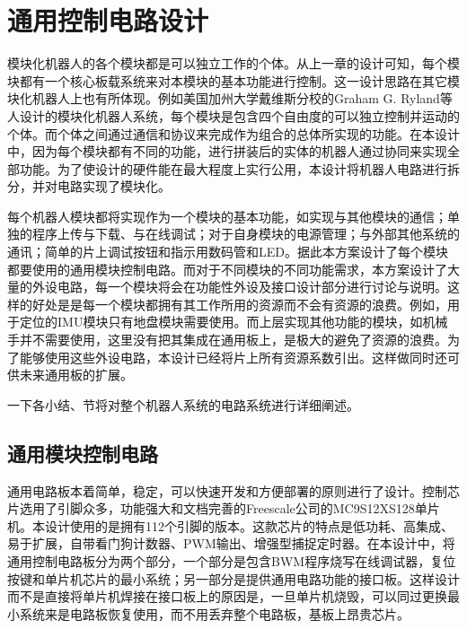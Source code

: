 

\chapter{通用控制电路设计}
\label{chap:electricalSystem}
模块化机器人的各个模块都是可以独立工作的个体。从上一章的设计可知，每个模块都有一个核心板载系统来对本模块的基本功能进行控制。这一设计思路在其它模块化机器人上也有所体现。例如美国加州大学戴维斯分校的Graham G. Ryland等人设计的模块化机器人系统，每个模块是包含四个自由度的可以独立控制并运动的个体。而个体之间通过通信和协议来完成作为组合的总体所实现的功能。在本设计中，因为每个模块都有不同的功能，进行拼装后的实体的机器人通过协同来实现全部功能。为了使设计的硬件能在最大程度上实行公用，本设计将机器人电路进行拆分，并对电路实现了模块化。

每个机器人模块都将实现作为一个模块的基本功能，如实现与其他模块的通信；单独的程序上传与下载、与在线调试；对于自身模块的电源管理；与外部其他系统的通讯；简单的片上调试按钮和指示用数码管和LED。据此本方案设计了每个模块都要使用的通用模块控制电路。而对于不同模块的不同功能需求，本方案设计了大量的外设电路，每一个模块将会在功能性外设及接口设计部分进行讨论与说明。这样的好处是是每一个模块都拥有其工作所用的资源而不会有资源的浪费。例如，用于定位的IMU模块只有地盘模块需要使用。而上层实现其他功能的模块，如机械手并不需要使用，这里没有把其集成在通用板上，是极大的避免了资源的浪费。为了能够使用这些外设电路，本设计已经将片上所有资源系数引出。这样做同时还可供未来通用板的扩展。

一下各小结、节将对整个机器人系统的电路系统进行详细阐述。

\section{通用模块控制电路}
通用电路板本着简单，稳定，可以快速开发和方便部署的原则进行了设计。控制芯片选用了引脚众多，功能强大和文档完善的Freescale公司的MC9S12XS128单片机。本设计使用的是拥有112个引脚的版本。这款芯片的特点是低功耗、高集成、易于扩展，自带看门狗计数器、PWM输出、增强型捕捉定时器。在本设计中，将通用控制电路板分为两个部分，一个部分是包含BWM程序烧写在线调试器，复位按键和单片机芯片的最小系统；另一部分是提供通用电路功能的接口板。这样设计而不是直接将单片机焊接在接口板上的原因是，一旦单片机烧毁，可以同过更换最小系统来是电路板恢复使用，而不用丢弃整个电路板，基板上昂贵芯片。

